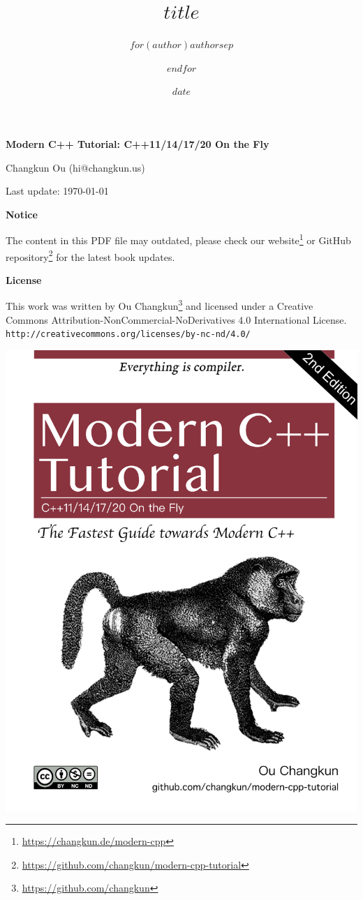 \documentclass[a4paper, 10pt]{article}
\title{$title$}
\author{$for(author)$$author$$sep$ \and $endfor$}
\date{$date$}
\makeatletter
\def\maxwidth{\ifdim\Gin@nat@width>\linewidth\linewidth
\else\Gin@nat@width\fi}
\let\Oldincludegraphics\includegraphics
\renewcommand{\includegraphics}[1]{\Oldincludegraphics[width=0.7\maxwidth]{#1}}
\renewcommand{\href}[2]{#2\footnote{\url{#1}}}
\makeatother
\begin{document}
\newcommand{\tightlist}{
  \setlength{\itemsep}{0pt}\setlength{\parskip}{0pt}}

\thispagestyle{plain}
\begin{center}

  {\LARGE\textbf{Modern C++ Tutorial: C++11/14/17/20 On the Fly}}

  \vspace{1em}
  {\large Changkun Ou (hi@changkun.us)}

  \vspace{1ex}
  Last update: \today

  \vspace{1ex}
  \textbf{Notice}

  \noindent The content in this PDF file may outdated, please check \href{https://changkun.de/modern-cpp}{our website} or \href{https://github.com/changkun/modern-cpp-tutorial}{GitHub repository} for the latest book updates.

  \vspace{1em}
  \textbf{\large License}

  \noindent This work was written by \href{https://github.com/changkun}{Ou Changkun} and licensed under a Creative Commons Attribution-NonCommercial-NoDerivatives 4.0 International License. \texttt{\small http://creativecommons.org/licenses/by-nc-nd/4.0/}

  \vspace{5em}
  \includegraphics{../../assets/cover-2nd-en}

\end{center}
\end{document}

